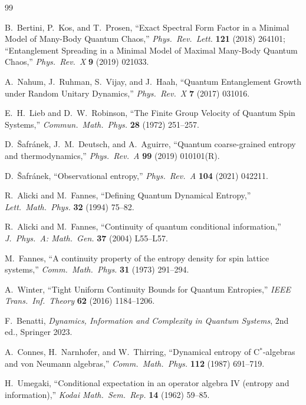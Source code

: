 \documentclass[12pt,a4paper]{article}
\begin{document}
\begin{thebibliography}{99}

  B.~Bertini, P.~Kos, and T.~Prosen,
  ``Exact Spectral Form Factor in a Minimal Model of Many-Body Quantum Chaos,''
  \emph{Phys.\ Rev.\ Lett.} \textbf{121} (2018) 264101;
  ``Entanglement Spreading in a Minimal Model of Maximal Many-Body Quantum Chaos,''
  \emph{Phys.\ Rev.\ X} \textbf{9} (2019) 021033.

  A.~Nahum, J.~Ruhman, S.~Vijay, and J.~Haah,
  ``Quantum Entanglement Growth under Random Unitary Dynamics,''
  \emph{Phys.\ Rev.\ X} \textbf{7} (2017) 031016.

  E.~H.~Lieb and D.~W.~Robinson,
  ``The Finite Group Velocity of Quantum Spin Systems,''
  \emph{Commun.\ Math.\ Phys.} \textbf{28} (1972) 251--257.

  D.~\v{S}afr\'anek, J.~M.~Deutsch, and A.~Aguirre,
  ``Quantum coarse-grained entropy and thermodynamics,''
  \emph{Phys.\ Rev.\ A} \textbf{99} (2019) 010101(R).

  D.~\v{S}afr\'anek,
  ``Observational entropy,''
  \emph{Phys.\ Rev.\ A} \textbf{104} (2021) 042211.

  R.~Alicki and M.~Fannes,
  ``Defining Quantum Dynamical Entropy,''
  \emph{Lett.\ Math.\ Phys.} \textbf{32} (1994) 75--82.

  R.~Alicki and M.~Fannes,
  ``Continuity of quantum conditional information,''
  \emph{J.\ Phys.\ A: Math.\ Gen.} \textbf{37} (2004) L55--L57.

  M.~Fannes,
  ``A continuity property of the entropy density for spin lattice systems,''
  \emph{Comm.\ Math.\ Phys.} \textbf{31} (1973) 291--294.

  A.~Winter,
  ``Tight Uniform Continuity Bounds for Quantum Entropies,''
  \emph{IEEE Trans.\ Inf.\ Theory} \textbf{62} (2016) 1184--1206.

  F.~Benatti,
  \emph{Dynamics, Information and Complexity in Quantum Systems},
  2nd ed., Springer 2023.

  A.~Connes, H.~Narnhofer, and W.~Thirring,
  ``Dynamical entropy of C$^*$-algebras and von Neumann algebras,''
  \emph{Comm.\ Math.\ Phys.} \textbf{112} (1987) 691--719.

  H.~Umegaki,
  ``Conditional expectation in an operator algebra IV (entropy and information),''
  \emph{Kodai Math.\ Sem.\ Rep.} \textbf{14} (1962) 59--85.


\end{thebibliography}
\end{document}
